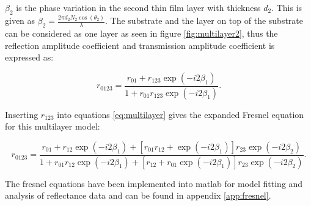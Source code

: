 \documentclass[MasterThesisMain.tex]{subfiles}
\begin{document}
$\beta_2$ is the phase variation in the second thin film layer with thickness $d_2$. This is given as $\beta_2=\frac{2\pi d_2N_2\cos(\theta_2)}{\lambda}$. The substrate and the layer on top of the substrate can be considered as one layer as seen in figure \ref{fig:multilayer2}, thus the reflection amplitude coefficient and transmission amplitude coefficient is expressed as:         

\begin{equation}\label{eq:multilayer}
r_{0123}= \frac{r_{01}+r_{123}\exp(-i2\beta_1)}{1+r_{01}r_{123}\exp(-i2\beta_1)}.
\end{equation}

Inserting $r_{123}$ into equations \ref{eq:multilayer} gives the expanded Fresnel equation for this multilayer model:

\begin{equation}
r_{0123} = \frac{r_{01}+r_{12}\exp(-i2\beta_1)+[r_{01}r_{12}+\exp(-i2\beta_1)]r_{23}\exp(-i2\beta_2)}{1+r_{01}r_{12}\exp(-i2\beta_1)+[r_{12}+r_{01}\exp(-i2\beta_1)]r_{23}\exp(-i2\beta_2)}.
\end{equation}

%
 
 
The fresnel equations have been implemented into matlab for model fitting and analysis of reflectance data and can be found in appendix \ref{app:fresnel}.  
\end{document}
